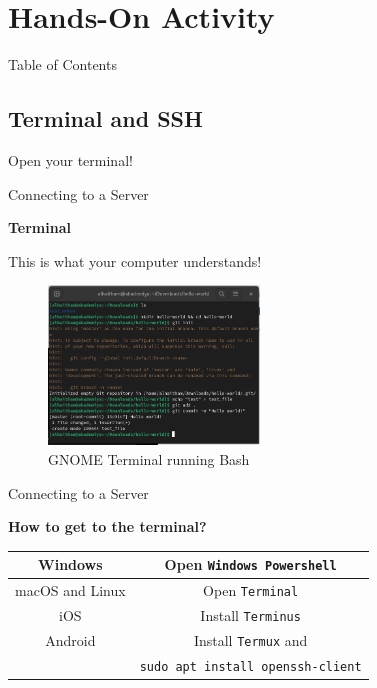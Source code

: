 \documentclass{beamer}
\begin{document}
\section{Hands-On Activity}
\begin{frame}{Table of Contents}
	\tableofcontents[currentsection]
\end{frame}

\subsection{Terminal and SSH}
\begin{frame}
	\begin{center}
		\Huge Open your terminal!
	\end{center}
\end{frame}

\begin{frame}{Connecting to a Server}
	\begin{Large}
		\textbf{Terminal} \\
	\end{Large}
	This is what your computer understands!
	\begin{figure}
		\centering
		\includegraphics[width=0.5\textwidth]{terminal.png}
		\caption{GNOME Terminal running Bash}
	\end{figure}
\end{frame}

\begin{frame}{Connecting to a Server}
	\begin{Large}
		\textbf{How to get to the terminal?} \\
	\end{Large}
	\begin{tabular}{|c|c|}
		\hline
		Windows & Open \texttt{Windows Powershell} \\
		\hline
		macOS and Linux & Open \texttt{Terminal} \\
		\hline
		iOS & Install \texttt{Terminus} \\
		\hline
		Android & Install \texttt{Termux} and \\
		& \texttt{sudo apt install openssh-client} \\
		\hline
	\end{tabular}
\end{frame}
\end{document}
